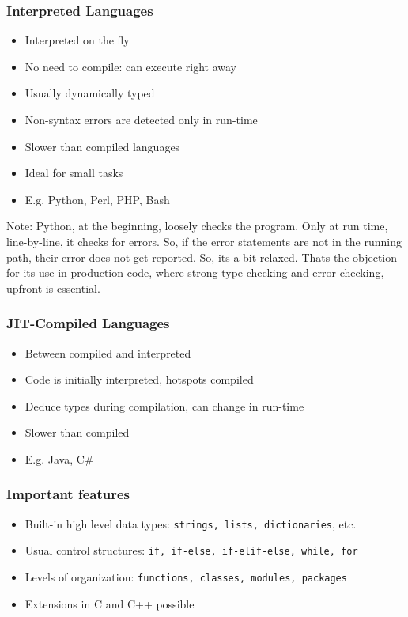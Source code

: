 \begin{frame}[fragile]  \frametitle{Interpreted Languages}
\begin{itemize}
\item  Interpreted on the fly
\item No need to compile: can execute right away
\item Usually dynamically typed
\item Non-syntax errors are detected only in run-time
\item Slower than compiled languages
\item Ideal for small tasks
\item  E.g. Python, Perl, PHP, Bash
\end{itemize}

Note: Python, at the beginning, loosely checks the program. Only at run time, line-by-line, it checks for errors. So, if the error statements are not in the running path, their error does not get reported. So, its a bit relaxed. Thats the objection for its use in production code, where strong type checking and error checking, upfront is essential.
\end{frame}

\begin{frame}[fragile]  \frametitle{JIT-Compiled Languages}
\begin{itemize}
\item Between compiled and interpreted
\item Code is initially interpreted, hotspots compiled
\item Deduce types during compilation, can change in run-time
\item Slower than compiled
\item E.g. Java, C\#
\end{itemize}
\end{frame}

\begin{frame}[fragile]  \frametitle{Important features}
\begin{itemize}
\item Built-in high level data types: \lstinline{strings, lists, dictionaries}, etc.
\item Usual control structures: \lstinline{if, if-else, if-elif-else, while, for}
\item Levels of organization: \lstinline{functions, classes, modules, packages}
\item Extensions in C and C++ possible
\end{itemize}
\end{frame}

